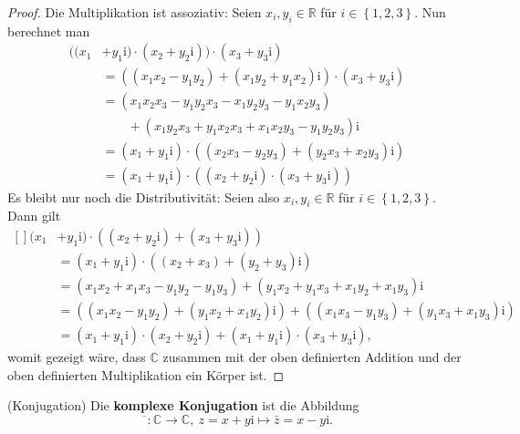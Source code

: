 \documentclass[../Analysis1_script.tex]{subfiles}
\begin{document}
\begin{proof}
	Die Multiplikation ist assoziativ: Seien $x_i,y_i \in \mathbb {R}$ für $i \in \left \lbrace {1,2,3} \right \rbrace$. Nun berechnet man 
	\begin{equation}
	\begin{aligned}
		((x_1&+y_1\mathrm {i})\cdot (x_2+y_2\mathrm {i}))\cdot (x_3+y_3\mathrm {i}) \\ &= ((x_1x_2-y_1y_2)+(x_1y_2+y_1x_2)\mathrm {i})\cdot (x_3+y_3\mathrm {i})\\ &= (x_1x_2x_3-y_1y_2x_3-x_1y_2y_3-y_1x_2y_3)\\ &\quad \quad + (x_1y_2x_3+y_1x_2x_3+x_1x_2y_3-y_1y_2y_3)\mathrm {i}\\ &= (x_1+y_1\mathrm {i})\cdot ((x_2x_3-y_2y_3)+(y_2x_3+x_2y_3)\mathrm {i})\\ &= (x_1+y_1\mathrm {i})\cdot ((x_2+y_2\mathrm {i})\cdot (x_3+y_3\mathrm {i}))
	\end{aligned}
	\end{equation}
	Es bleibt nur noch die Distributivität: Seien also $x_i,y_i \in \mathbb {R}$ für $i \in \left \lbrace {1,2,3} \right \rbrace$. Dann gilt  
	\begin{equation}
	\begin{aligned}[](x_1&+y_1\mathrm {i})\cdot ((x_2+y_2\mathrm {i}) + (x_3+y_3\mathrm {i})) \\ &= (x_1+y_1\mathrm {i})\cdot ((x_2+x_3)+(y_2+y_3)\mathrm {i} ) \\ &= (x_1x_2+x_1x_3-y_1y_2-y_1y_3) + (y_1x_2+y_1x_3+x_1y_2+x_1y_3)\mathrm {i} \\ &= ((x_1x_2-y_1y_2) + (y_1x_2+x_1y_2)\mathrm {i}) + ((x_1x_3-y_1y_3) + (y_1x_3+x_1y_3)\mathrm {i})\\ &=(x_1+y_1\mathrm {i})\cdot (x_2+y_2\mathrm {i}) + (x_1+y_1 \mathrm {i})\cdot (x_3+y_3\mathrm {i}),
	\end{aligned}
	\end{equation}
	womit gezeigt wäre, dass $\mathbb {C}$ zusammen mit der oben definierten Addition und der oben definierten Multiplikation ein Körper ist. 
\end{proof}

\begin{definition}{(Konjugation)}
	Die \textbf{komplexe Konjugation} ist die Abbildung
	\begin{equation}
		\overline { \phantom {z} }: \mathbb {C} \to \mathbb {C},\ z = x+y\mathrm {i} \mapsto \bar {z} = x-y\mathrm {i}.
	\end{equation} 
\end{definition}	
\end{document}
